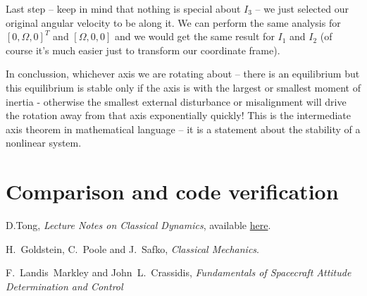 \documentclass[a4paper]{article}
\begin{document}
	Last step -- keep in mind that nothing is special about $I_3$ -- we just selected our original angular velocity to be along it.
	We can perform the same analysis for $[ 0 , \Omega , 0 ]^T$ and $[ \Omega , 0 , 0 ]$ and we would get the same result for $I_1$ and $I_2$ (of course it's much easier just to transform our coordinate frame).
	
	In conclussion, whichever axis we are rotating about -- there is an equilibrium but this equilibrium is stable only if the axis is with the largest or smallest moment of inertia - otherwise the smallest external disturbance or misalignment will drive the rotation away from that axis exponentially quickly!
	This is the intermediate axis theorem in mathematical language -- it is a statement about the stability of a nonlinear system. 

	\section{Comparison and code verification}
	
	\begin{thebibliography}{9}

	D.Tong, \textit{Lecture Notes on Classical Dynamics}, available \href{http://www.damtp.cam.ac.uk/user/tong/dynamics/clas.pdf}{here}.

	H.~Goldstein, C.~Poole and J.~Safko, \textit{Classical Mechanics}.
	
	F.~Landis~Markley and John~L.~Crassidis, \textit{Fundamentals of Spacecraft Attitude Determination and Control}



	\end{thebibliography}
\end{document}
